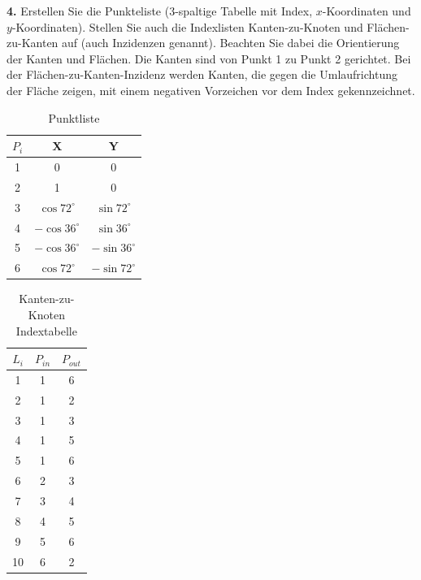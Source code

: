 \documentclass[Protokollheft.tex]{subfiles}
\begin{document}
        \begin{framed}
	\noindent \textbf{4.} Erstellen Sie die Punkteliste (3-spaltige Tabelle mit Index, $x$-Koordinaten und $y$-Koordinaten). Stellen Sie auch die Indexlisten Kanten-zu-Knoten und Flächen-zu-Kanten auf (auch Inzidenzen genannt).
                    Beachten Sie dabei die Orientierung der Kanten und Flächen. Die Kanten sind von Punkt 1
                    zu Punkt 2 gerichtet. Bei der Flächen-zu-Kanten-Inzidenz werden Kanten, die gegen die
                    Umlaufrichtung der Fläche zeigen, mit einem negativen Vorzeichen vor dem Index gekennzeichnet.\label{exer:incidences}
\end{framed}

\begin{table}[h!]
	\begin{center}
	
	\label{tab:table1}
	\begin{tabular}{c|c|c} %
		$P_i$ & X & Y\\
		\hline
		1 & 0 & 0\\
		2 & 1 & 0\\
		3 & $\cos 72^\circ$ &$\sin 72^\circ$ \\
		4 & $-\cos 36^\circ$ &$\sin 36^\circ$ \\
		5 & $-\cos 36^\circ$ &$-\sin 36^\circ$ \\
		6 & $\cos 72^\circ$ &$-\sin 72^\circ$ \\
	\end{tabular}
	\end{center}
\caption{Punktliste}

\end{table}
\begin{table}[h!]
	\begin{center}
	
		\label{tab:table2}
		\begin{tabular}{c|c|c} %
			$L_i$ & $P_{in}$ & $P_{out}$\\
			\hline
			1 & 1 & 6\\
			2 & 1 & 2\\
			3 & 1 & 3\\
			4 & 1 & 5\\
			5 & 1 & 6\\
			6 & 2 & 3\\
			7 & 3 & 4\\
			8 & 4 & 5\\
			9 & 5 & 6\\
			10 & 6 & 2\\  
		\end{tabular}
			\end{center}
		\caption{Kanten-zu-Knoten Indextabelle}
	
\end{table}
\end{document}
